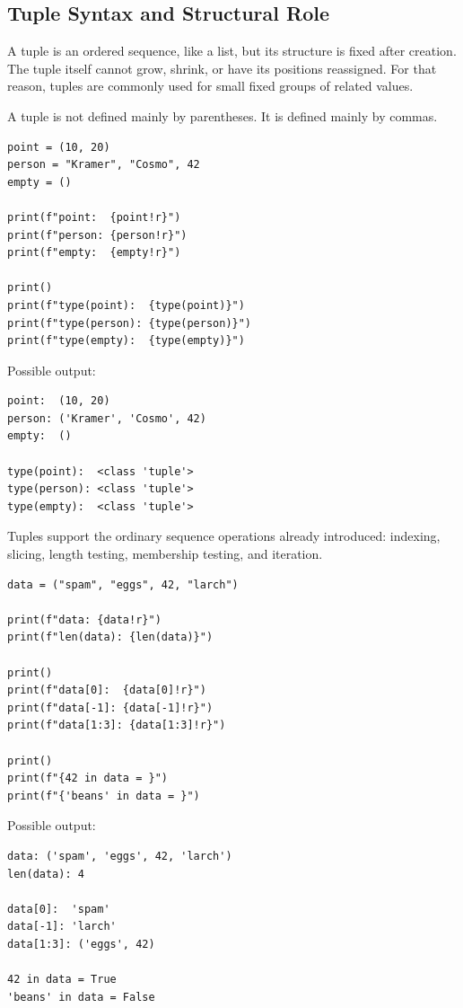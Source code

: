 \subsection{Tuple Syntax and Structural Role}

A tuple is an ordered sequence, like a list, but its structure is fixed after creation. The tuple itself cannot grow, shrink, or have its positions reassigned. For that reason, tuples are commonly used for small fixed groups of related values.

A tuple is not defined mainly by parentheses. It is defined mainly by commas.

\begin{verbatim}
point = (10, 20)
person = "Kramer", "Cosmo", 42
empty = ()

print(f"point:  {point!r}")
print(f"person: {person!r}")
print(f"empty:  {empty!r}")

print()
print(f"type(point):  {type(point)}")
print(f"type(person): {type(person)}")
print(f"type(empty):  {type(empty)}")
\end{verbatim}

Possible output:

\begin{verbatim}
point:  (10, 20)
person: ('Kramer', 'Cosmo', 42)
empty:  ()

type(point):  <class 'tuple'>
type(person): <class 'tuple'>
type(empty):  <class 'tuple'>
\end{verbatim}

Tuples support the ordinary sequence operations already introduced: indexing, slicing, length testing, membership testing, and iteration.

\begin{verbatim}
data = ("spam", "eggs", 42, "larch")

print(f"data: {data!r}")
print(f"len(data): {len(data)}")

print()
print(f"data[0]:  {data[0]!r}")
print(f"data[-1]: {data[-1]!r}")
print(f"data[1:3]: {data[1:3]!r}")

print()
print(f"{42 in data = }")
print(f"{'beans' in data = }")
\end{verbatim}

Possible output:

\begin{verbatim}
data: ('spam', 'eggs', 42, 'larch')
len(data): 4

data[0]:  'spam'
data[-1]: 'larch'
data[1:3]: ('eggs', 42)

42 in data = True
'beans' in data = False
\end{verbatim}

